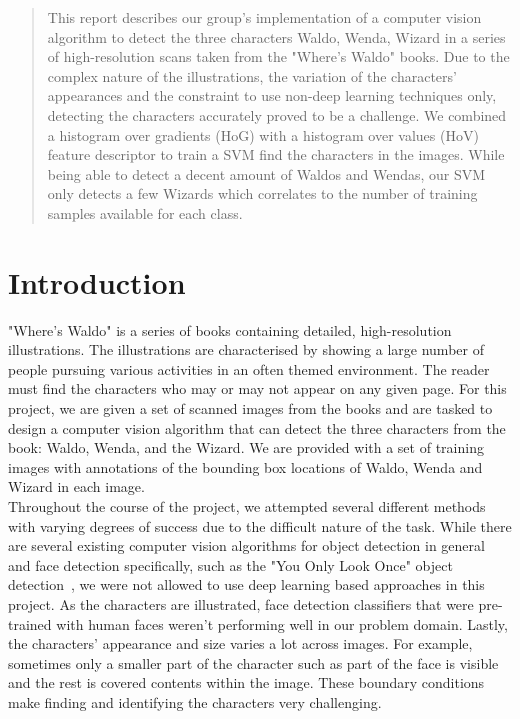 \documentclass[11pt]{article}
\begin{document}
	


\begin{abstract}
This report describes our group's implementation of a computer vision algorithm to detect the three
characters Waldo, Wenda, Wizard in a series of high-resolution scans taken from the "Where's Waldo"
books. Due to the complex nature of the illustrations, the variation of the characters' appearances
and the constraint to use non-deep learning techniques only, detecting the characters accurately
proved to be a challenge. We combined a histogram over gradients (HoG) with a histogram over values
(HoV) feature descriptor to train a SVM find the characters in the images. While being able to
detect a decent amount of Waldos and Wendas, our SVM only detects a few Wizards which correlates to
the number of training samples available for each class.
\end{abstract}

\section{Introduction}

"Where's Waldo" is a series of books containing detailed, high-resolution illustrations. The
illustrations are characterised by showing a large number of people pursuing various activities in an
often themed environment. The reader must find the characters who may or may not appear on any given
page. For this project, we are given a set of scanned images from the books and are tasked to design a
computer vision algorithm that can detect the three characters from the book: Waldo, Wenda, and the
Wizard. We are provided with a set of training images with annotations of the bounding box locations of
Waldo, Wenda and Wizard in each image.\\

Throughout the course of the project, we attempted several different methods with varying degrees
of success due to the difficult nature of the task. While there are several existing computer vision
algorithms for object detection in general and face detection specifically, such as the "You Only Look
Once" object detection~\cite{redmon2016yolo}, we were not allowed to use deep learning based approaches
in this project. As the characters are illustrated, face detection classifiers that were pre-trained
with human faces weren't performing well in our problem domain. Lastly, the characters' appearance and size
varies a lot across images. For example, sometimes only a smaller part of the character such as part
of the face is visible and the rest is covered contents within the image. These boundary conditions
make finding and identifying the characters very challenging.\\
\end{document}
